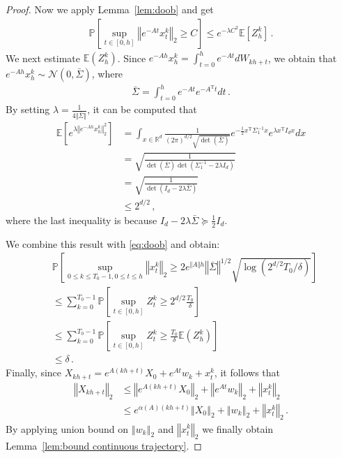 \documentclass{article}
\theoremstyle{definition}
\begin{document}
\begin{proof}
Now we apply Lemma~\ref{lem:doob} and get
\begin{align}\label{eq:doob}
\mathbb{P}\left[\sup_{t\in[0,h]}\left\Vert e^{-At}x^{k}_{t}\right\Vert _{2}\geq C\right]\leq e^{-\lambda C^{2}}\mathbb{E}[Z^{k}_{h}]\,.
\end{align}
We next estimate $\mathbb{E}(Z^{k}_{h})$. Since $e^{-Ah}x^{k}_{h}=\int_{t=0}^{h}e^{-At}dW_{kh+t}$, we obtain that $e^{-Ah}x_{h}^{k}\sim\mathcal{N}(0,\bar{\Sigma})$, where
\begin{align*}
\bar{\Sigma}=\int_{t=0}^{h}e^{-At}e^{-A^{\mathrm{T}}t}dt\,.
\end{align*}
By setting $\lambda=\frac{1}{4\Vert \bar{\Sigma}\Vert }$, it can be computed that
\begin{align*}
\mathbb{E}\left[e^{\lambda\left\Vert e^{-Ah}x^{k}_{h}\right\Vert ^{2}_{2}}\right]
&=\int_{x\in\mathbb{R}^{d}}\frac{1}{(2\pi)^{d/2}\sqrt{\det(\bar{\Sigma})}}e^{-\frac{1}{2}x^{\mathrm{T}}\Sigma^{-1}_{1}x}e^{\lambda x^{\mathrm{T}}I_{d}x}dx\\
&=\sqrt{\frac{1}{\det(\bar{\Sigma})\det(\Sigma^{-1}_{1}-2\lambda I_{d})}}\\
&=\sqrt{\frac{1}{\det(I_{d}-2\lambda\bar{\Sigma})}}\\
&\leq 2^{d/2}\,,
\end{align*}
where the last inequality is because $I_{d}-2\lambda\bar{\Sigma}\succeq \frac{1}{2}I_{d}$.

We combine this result with \eqref{eq:doob} and obtain:
\begin{align*}
&\mathbb{P}\left[\sup_{0\leq k\leq T_{0}-1, 0\leq t\leq h}\left\Vert x^{k}_{t}\right\Vert _{2}\geq 2e^{\Vert A\Vert h}\left\Vert \bar{\Sigma}\right\Vert ^{1/2}\sqrt{\log(2^{d/2}T_{0}/\delta)}\right]\\
&\leq \sum_{k=0}^{T_{0}-1}\mathbb{P}\left[\sup_{t\in[0,h]}Z^{k}_{t}\geq 2^{d/2}\frac{T_{0}}{\delta}\right]\\
&\leq \sum_{k=0}^{T_{0}-1}\mathbb{P}\left[\sup_{t\in[0,h]}Z^{k}_{t}\geq \frac{T_{0}}{\delta}\mathbb{E}(Z^{k}_{h})\right]\\
&\leq \delta\,.
\end{align*}
Finally, since $X_{kh+t}=e^{A(kh+t)}X_{0}+e^{At}w_{k}+x^{k}_{t}$, it follows that
\begin{align*}
\left\Vert X_{kh+t}\right\Vert _{2}&\leq \left\Vert e^{A(kh+t)}X_{0}\right\Vert _{2}+\left\Vert e^{At}w_{k}\right\Vert _{2}+\left\Vert x^{k}_{t}\right\Vert _{2}\\
&\leq e^{\alpha(A)(kh+t)}\left\Vert X_{0}\right\Vert _{2}+\left\Vert w_{k}\right\Vert _{2}+\left\Vert x^{k}_{t}\right\Vert _{2}\,.
\end{align*}
By applying union bound on $\left\Vert w_{k}\right\Vert _{2}$ and $\left\Vert x^{k}_{t}\right\Vert _{2}$ we finally obtain Lemma~\ref{lem:bound continuous trajectory}.
\end{proof}   
\end{document}
